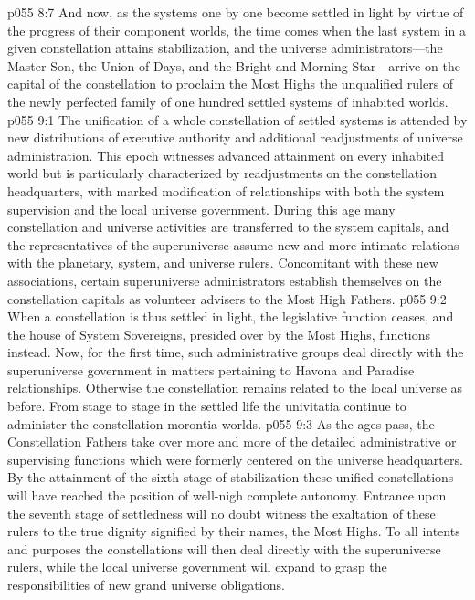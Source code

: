 \pc \vs p055 8:7 And now, as the systems one by one become settled in light by virtue of the progress of their component worlds, the time comes when the last system in a given constellation attains stabilization, and the universe administrators---the Master Son, the Union of Days, and the Bright and Morning Star---arrive on the capital of the constellation to proclaim the Most Highs the unqualified rulers of the newly perfected family of one hundred settled systems of inhabited worlds.
\vs p055 9:1 The unification of a whole constellation of settled systems is attended by new distributions of executive authority and additional readjustments of universe administration. This epoch witnesses advanced attainment on every inhabited world but is particularly characterized by readjustments on the constellation headquarters, with marked modification of relationships with both the system supervision and the local universe government. During this age many constellation and universe activities are transferred to the system capitals, and the representatives of the superuniverse assume new and more intimate relations with the planetary, system, and universe rulers. Concomitant with these new associations, certain superuniverse administrators establish themselves on the constellation capitals as volunteer advisers to the Most High Fathers.
\vs p055 9:2 When a constellation is thus settled in light, the legislative function ceases, and the house of System Sovereigns, presided over by the Most Highs, functions instead. Now, for the first time, such administrative groups deal directly with the superuniverse government in matters pertaining to Havona and Paradise relationships. Otherwise the constellation remains related to the local universe as before. From stage to stage in the settled life the univitatia continue to administer the constellation morontia worlds.
\vs p055 9:3 As the ages pass, the Constellation Fathers take over more and more of the detailed administrative or supervising functions which were formerly centered on the universe headquarters. By the attainment of the sixth stage of stabilization these unified constellations will have reached the position of well\hyp{}nigh complete autonomy. Entrance upon the seventh stage of settledness will no doubt witness the exaltation of these rulers to the true dignity signified by their names, the Most Highs. To all intents and purposes the constellations will then deal directly with the superuniverse rulers, while the local universe government will expand to grasp the responsibilities of new grand universe obligations.
